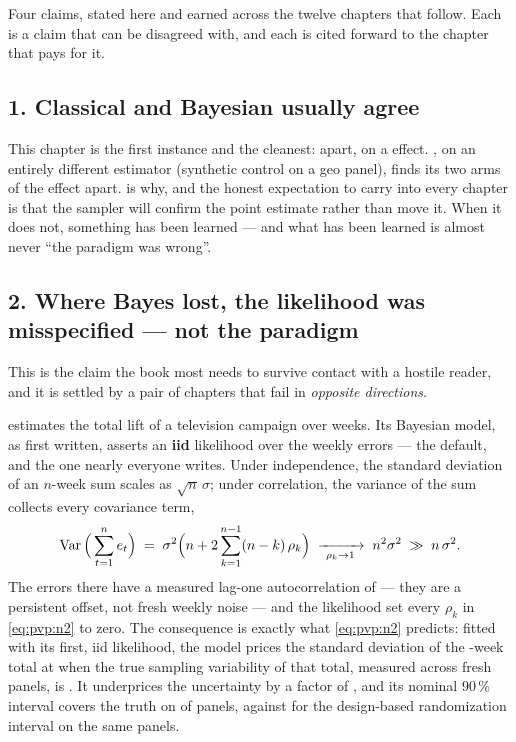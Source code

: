 Four claims, stated here and earned across the twelve chapters that follow. Each is a claim that
can be disagreed with, and each is cited forward to the chapter that pays for it.

\subsection*{1. Classical and Bayesian usually agree}

This chapter is the first instance and the cleanest: \eur{\nbZeroEstGap} apart, on a
\eur{\nbZeroTrueDag} effect. , on an entirely different estimator (synthetic control on a
geo panel), finds its two arms \pc{\nbSevenEstDiffPct} of the effect apart.  is
why, and the honest expectation to carry into every chapter is that the sampler will confirm the
point estimate rather than move it. When it does not, something has been learned --- and what has
been learned is almost never ``the paradigm was wrong''.

\subsection*{2. Where Bayes lost, the likelihood was misspecified --- not the paradigm}

This is the claim the book most needs to survive contact with a hostile reader, and it is settled
by a pair of chapters that fail in \emph{opposite directions}.

 estimates the total lift of a television campaign over \nbSevenNPost{} weeks. Its
Bayesian model, as first written, asserts an \textbf{iid} likelihood over the weekly errors ---
the default, and the one nearly everyone writes. Under independence, the
standard deviation of an $n$-week sum scales as $\sqrt{n}\,\sigma$; under correlation, the variance
of the sum collects every covariance term,
%
\begin{equation}
  \operatorname{Var}\Big(\sum_{t=1}^{n} e_t\Big) \;=\; \sigma^2\Big(n + 2\sum_{k=1}^{n-1}(n - k)\,\rho_k\Big)
  \;\xrightarrow[\ \rho_k \to 1\ ]{}\; n^2\sigma^2 \;\gg\; n\,\sigma^2 .
  \label{eq:pvp:n2}
\end{equation}
%
The errors there have a measured lag-one autocorrelation of \nbSevenRhoOne{} --- they are a
persistent offset, not fresh weekly noise --- and the likelihood set every $\rho_k$ in
\cref{eq:pvp:n2} to zero. The consequence is exactly what \cref{eq:pvp:n2} predicts: fitted with its
first, iid likelihood, the model prices the standard deviation of the \nbSevenNPost-week total at
\keur{\nbSevenIidSd} when the true sampling variability of that total, measured across fresh panels,
is \keur{\nbSevenSeedSd}. It underprices the uncertainty by a factor of \nbSevenUnderprice, and its
nominal 90\,\% interval covers the truth on \pc{\nbSevenTotalCov} of panels, against
\pc{\nbSevenRiCov} for the design-based randomization interval on the same panels.

